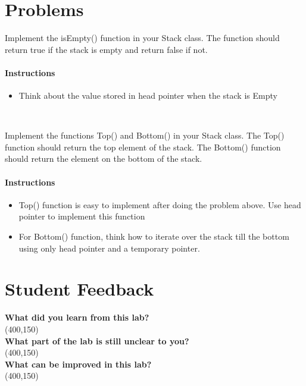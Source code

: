 \documentclass[11pt,fleqn]{book} %
\begin{document}
 \section{Problems}
 \begin{problem}
 	Implement the isEmpty() function in your Stack class. The function should return true if the stack is empty and return false if not.
 	\paragraph{Instructions}
 	\begin{itemize}
 		\item Think about the value stored in head pointer when the stack is Empty
 	\end{itemize}
 \end{problem}
~\\
\begin{problem}
	Implement the  functions Top() and Bottom() in your Stack class. The Top() function should return the top element of the stack. The Bottom() function should return the element on the bottom of the stack.
	\paragraph{Instructions}
		\begin{itemize}
			\item Top() function is easy to implement after doing the problem above. Use head pointer to implement this function
			\item For Bottom() function, think how to iterate over the stack till the bottom using only head pointer and a temporary pointer.
		\end{itemize}
\end{problem}

\newpage
 \section{Student Feedback}
 \textbf{What did you learn from this lab?}\\ 
 \framebox(400,150){}\\
 \textbf{What part of the lab is still unclear to you?}\\
 \framebox(400,150){}\\
 \textbf{What can be improved in this lab?}\\ 
 \framebox(400,150){}\\


\newpage
\end{document}
